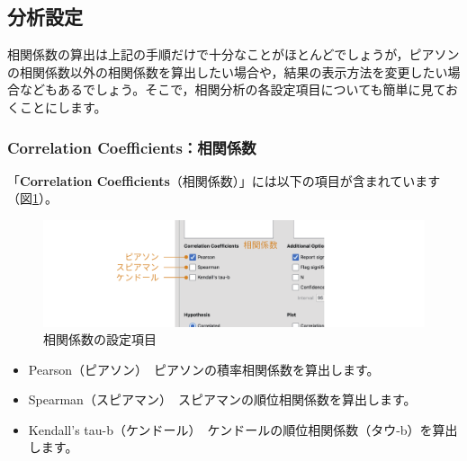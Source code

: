 \documentclass[
  12pt,
  a5jpaper,
  lualatex, ja=standard]{bxjsbook}
\providecommand{\tightlist}{%
  \setlength{\itemsep}{0pt}\setlength{\parskip}{0pt}}
\newenvironment{jmvsettings}{%
	\begin{center}%
	\begin{tcolorbox}[%
		title=設定項目,
		colframe=gmoji,
		colbacktitle=gmoji,
		colback=gmoji!2!white,
		breakable,
		width=.9\textwidth,
		]\small\addtolength{\leftmargini}{-3\labelsep}%
	}%
	{\end{tcolorbox}\end{center}}
\begin{document}
\hypertarget{sub:regression-correlation-setting}{%
\subsection{分析設定}\label{sub:regression-correlation-setting}}

相関係数の算出は上記の手順だけで十分なことがほとんどでしょうが，ピアソンの相関係数以外の相関係数を算出したい場合や，結果の表示方法を変更したい場合などもあるでしょう。そこで，相関分析の各設定項目についても簡単に見ておくことにします。

\hypertarget{correlation-coefficientsux76f8ux95a2ux4fc2ux6570}{%
\subsubsection*{Correlation Coefficients：相関係数}\label{correlation-coefficientsux76f8ux95a2ux4fc2ux6570}}

「\textbf{Correlation Coefficients}（相関係数）」には以下の項目が含まれています（図\ref{fig:regression-cor-coeff}）。

\begin{figure}[!ht]

{\centering \includegraphics[width=1\linewidth]{images/regression/cor-coeff} 

}

\caption{相関係数の設定項目}\label{fig:regression-cor-coeff}
\end{figure}

\begin{jmvsettings}

\begin{itemize}
\tightlist
\item
  Pearson（ピアソン）　ピアソンの積率相関係数を算出します。
\item
  Spearman（スピアマン）　スピアマンの順位相関係数を算出します。
\item
  Kendall's tau-b（ケンドール）　ケンドールの順位相関係数（タウ-b）を算出します。
\end{itemize}

\end{jmvsettings}
\end{document}
